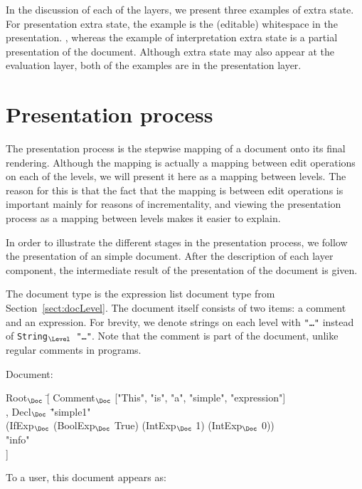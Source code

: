 \bc
In the discussion of each of the layers, we present three examples of extra state. For presentation extra state, the example is the (editable) whitespace in the presentation. , whereas the example of interpretation extra state is a partial presentation of the document. Although extra state may also appear at the evaluation layer, both of the examples are in the presentation layer. 
\ec


%																
%																
%																
\section{Presentation process} \label{sect:presprocess}

The presentation process is the stepwise mapping of a document onto its final rendering. Although the mapping is actually a mapping between edit operations on each of the levels, we will present it here as a mapping between levels. The reason for this is that the fact that the mapping is between edit operations is important mainly for reasons of incrementality, and viewing the presentation process as a mapping between levels makes it easier to explain.

In order to illustrate the different stages in the presentation process, we follow the presentation of an simple document. After the description of each layer component, the intermediate result of the presentation of the document is given. 

The document type is the expression list document type from Section~\ref{sect:docLevel}. The document itself consists of two items: a comment and an expression. For brevity, we denote strings on each level with {\tt "\dots"} instead of {\tt String$_{\Level}$ "\dots"}. Note that the comment is part of the document, unlike regular comments in programs.

Document:
\small \ttfamily
\begin{tabbing}
Root$_{\Doc}$ \= [ Comment$_{\Doc}$ ["This", "is", "a", "simple", "expression"] \\
       \> , Decl$_{\Doc}$ \= "simple1" \\
       \>                        \>(IfExp$_{\Doc}$ (BoolExp$_{\Doc}$ True) (IntExp$_{\Doc}$ 1) (IntExp$_{\Doc}$ 0))\\
       \>                        \> "info"\\
       \> ] 
\end{tabbing}
\rmfamily \normalsize

To a user, this document appears as:\\

